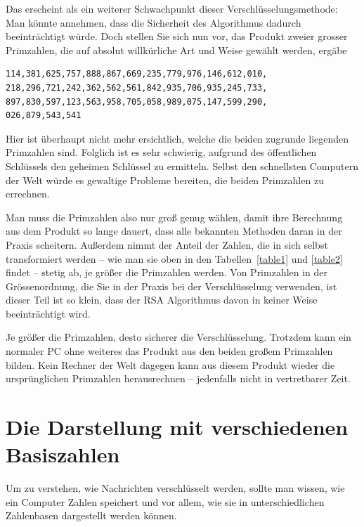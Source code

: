\documentclass[a4paper,11pt, oneside,openright,titlepage,dvips]{scrbook}
\newcounter{chapter}
\newcounter{section}[chapter]
\begin{document}
\clearpage

Das erscheint als ein weiterer Schwachpunkt dieser
Verschlüsselungsmethode: Man könnte annehmen, dass die Sicherheit des
Algorithmus dadurch beeinträchtigt würde.  Doch stellen Sie sich nun
vor, das Produkt zweier grosser Primzahlen, die auf absolut
willkürliche Art und Weise gewählt werden, ergäbe


\begin{verbatim}
114,381,625,757,888,867,669,235,779,976,146,612,010,
218,296,721,242,362,562,561,842,935,706,935,245,733,
897,830,597,123,563,958,705,058,989,075,147,599,290,
026,879,543,541
\end{verbatim}

Hier ist überhaupt nicht mehr ersichtlich, welche die beiden zugrunde
liegenden Primzahlen sind. Folglich ist es sehr schwierig, aufgrund
des öffentlichen Schlüssels den geheimen Schlüssel zu ermitteln.
Selbst den schnellsten Computern der Welt würde es gewaltige Probleme
bereiten, die beiden Primzahlen zu errechnen.

Man muss die Primzahlen also nur groß genug wählen, damit ihre
Berechnung aus dem Produkt so lange dauert, dass alle bekannten
Methoden daran in der Praxis scheitern.  Außerdem nimmt der Anteil der
Zahlen, die in sich selbst transformiert werden --­ wie man sie oben
in den Tabellen~\ref{table1} und \ref{table2} findet -- stetig ab, je größer die
Primzahlen werden.  Von Primzahlen in der Grössenordnung, die Sie in der
Praxis bei der Verschlüsselung verwenden, ist dieser Teil ist so
klein, dass der RSA Algorithmus davon in keiner Weise beeinträchtigt
wird.

Je größer die Primzahlen, desto sicherer die Verschlüsselung.
Trotzdem kann ein normaler PC ohne weiteres das Produkt aus den beiden
großem Primzahlen bilden. Kein Rechner der Welt dagegen kann aus
diesem Produkt wieder die ursprünglichen Primzahlen herausrechnen --­
jedenfalls nicht in vertretbarer Zeit.


\clearpage
\section{Die Darstellung mit verschiedenen Basiszahlen
 }

Um zu verstehen, wie Nachrichten verschlüsselt werden, sollte man
wissen, wie ein Computer Zahlen speichert und vor allem, wie sie in
unterschiedlichen Zahlenbasen dargestellt werden können.
\end{document}
